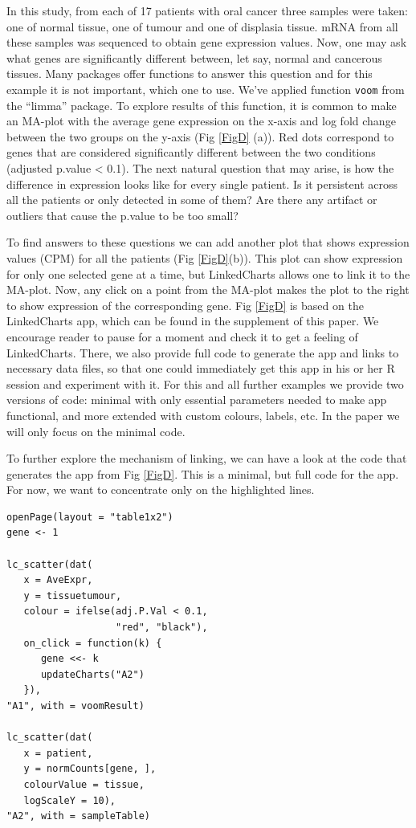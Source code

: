 \documentclass[twocolumn,10pt]{article}
\begin{document}
In this study, from each of 17 patients with oral cancer three samples were taken: one of normal tissue, one of tumour and one of displasia tissue. mRNA from all these samples was sequenced to obtain gene expression values. Now, one may ask what genes are significantly different between, let say, normal and cancerous tissues. Many packages offer functions to answer this question and for this example it is not important, which one to use. We've applied function \texttt{voom} from the ``limma'' \citep{ritchie_2015} package. To explore results of this function, it is common to make an MA-plot with the average gene expression on the x-axis and log fold change between the two groups on the y-axis (Fig \ref{FigD} (a)). Red dots correspond to genes that are considered significantly different between the two conditions (adjusted p.value < 0.1). The next natural question that may arise, is how the difference in expression looks like for every single patient. Is it persistent across all the patients or only detected in some of them? Are there any artifact or outliers that cause the p.value to be too small?

To find answers to these questions we can add another plot that shows expression values (CPM) for all the patients (Fig \ref{FigD}(b)). This plot can show expression for only one selected gene at a time, but LinkedCharts allows one to link it to the MA-plot. Now, any click on a point from the MA-plot makes the plot to the right to show expression of the corresponding gene. Fig \ref{FigD} is based on the LinkedCharts app, which can be found in the supplement of this paper. We encourage reader to pause for a moment and check it to get a feeling of LinkedCharts. There, we also provide full code to generate the app and links to necessary data files, so that one could immediately get this app in his or her R session and experiment with it. For this and all further examples we provide two versions of code: minimal with only essential parameters needed to make app functional, and more extended with custom colours, labels, etc. In the paper we will only focus on the minimal code.

To further explore the mechanism of linking, we can have a look at the code that generates the app from Fig \ref{FigD}. This is a minimal, but full code for the app. For now, we want to concentrate only on the highlighted lines.

\begin{verbatim}
openPage(layout = "table1x2")
gene <- 1

lc_scatter(dat(
   x = AveExpr,
   y = tissuetumour,
   colour = ifelse(adj.P.Val < 0.1, 
                   "red", "black"),
   on_click = function(k) {
      gene <<- k
      updateCharts("A2")
   }),
"A1", with = voomResult)

lc_scatter(dat(
   x = patient,
   y = normCounts[gene, ],
   colourValue = tissue, 
   logScaleY = 10),
"A2", with = sampleTable)
\end{verbatim}
\end{document}

